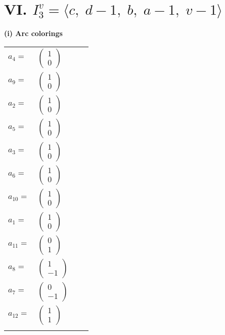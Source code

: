 \documentclass[1p]{elsarticle_modified}
\theoremstyle{definition}
\begin{document}
\centering \section*{VI. $I^v_{3}= \langle c,\;d-1,\;b,\;a-1,\;v-1 \rangle$}
\flushleft \textbf{(i) Arc colorings}\\
\begin{tabular}{m{7pt} m{180pt} m{7pt} m{180pt} }
\flushright $a_{4}=$&$\begin{pmatrix}1\\0\end{pmatrix}$ \\
\flushright $a_{9}=$&$\begin{pmatrix}1\\0\end{pmatrix}$ \\
\flushright $a_{2}=$&$\begin{pmatrix}1\\0\end{pmatrix}$ \\
\flushright $a_{5}=$&$\begin{pmatrix}1\\0\end{pmatrix}$ \\
\flushright $a_{3}=$&$\begin{pmatrix}1\\0\end{pmatrix}$ \\
\flushright $a_{6}=$&$\begin{pmatrix}1\\0\end{pmatrix}$ \\
\flushright $a_{10}=$&$\begin{pmatrix}1\\0\end{pmatrix}$ \\
\flushright $a_{1}=$&$\begin{pmatrix}1\\0\end{pmatrix}$ \\
\flushright $a_{11}=$&$\begin{pmatrix}0\\1\end{pmatrix}$ \\
\flushright $a_{8}=$&$\begin{pmatrix}1\\-1\end{pmatrix}$ \\
\flushright $a_{7}=$&$\begin{pmatrix}0\\-1\end{pmatrix}$ \\
\flushright $a_{12}=$&$\begin{pmatrix}1\\1\end{pmatrix}$\\&\end{tabular}
\end{document}
